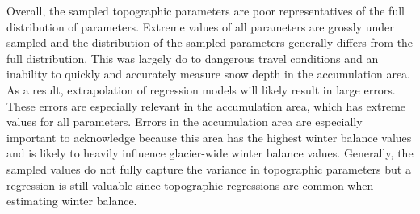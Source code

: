 \documentclass{sfuthesis}
\begin{document}
Overall, the sampled topographic parameters are poor representatives of the full distribution of parameters. Extreme values of all parameters are grossly under sampled and the distribution of the sampled parameters generally differs from the full distribution. This was largely do to dangerous travel conditions and an inability to quickly and accurately measure snow depth in the accumulation area. As a result, extrapolation of regression models will likely result in large errors. These errors are especially relevant in the accumulation area, which has extreme values for all parameters. Errors in the accumulation area are especially important to acknowledge because this area has the highest winter balance values and is likely to heavily influence glacier-wide winter balance values. Generally, the sampled values do not fully capture the variance in topographic parameters but a regression is still valuable  since topographic regressions are common when estimating winter balance.  
\end{document}
